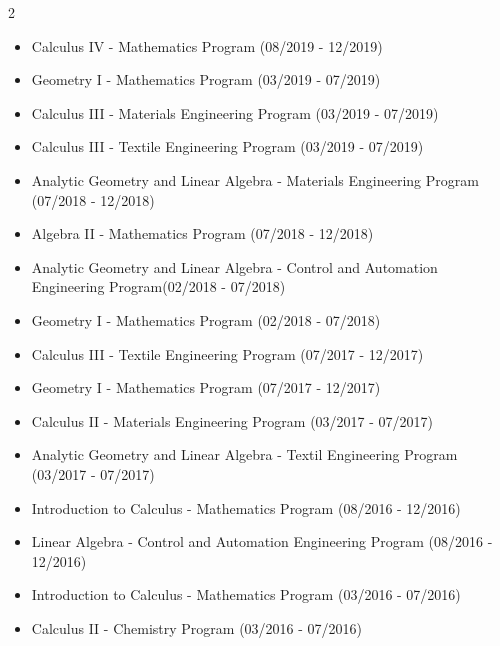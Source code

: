 \documentclass[10pt,A4,english]{article}
\begin{document}
\begin{paracol}{2}
\begin{rightcolumn}
\begin{enumerate}
\begin{itemize}
        \item Calculus IV - Mathematics Program (08/2019 - 12/2019)
        
        \item Geometry I - Mathematics Program (03/2019 - 07/2019)
        
        \item Calculus III - Materials Engineering Program (03/2019 - 07/2019)
        
        \item Calculus III - Textile Engineering Program (03/2019 - 07/2019)
        
        \item Analytic Geometry and Linear Algebra - Materials Engineering Program (07/2018 - 12/2018)
        
        \item Algebra II - Mathematics Program (07/2018 - 12/2018)
        
        \item Analytic Geometry and Linear Algebra - Control and Automation Engineering Program(02/2018 - 07/2018)
        
        \item Geometry I - Mathematics Program (02/2018 - 07/2018)
        
        \item Calculus III - Textile Engineering Program (07/2017 - 12/2017)
        
        \item Geometry I - Mathematics Program (07/2017 - 12/2017)
        
        \item Calculus II - Materials Engineering Program (03/2017 - 07/2017)
        
        \item Analytic Geometry and Linear Algebra - Textil Engineering Program (03/2017 - 07/2017)
        
        \item Introduction to Calculus - Mathematics Program (08/2016 - 12/2016)
        
        \item Linear Algebra - Control and Automation Engineering Program (08/2016 - 12/2016)
        
        \item Introduction to Calculus - Mathematics Program (03/2016 - 07/2016)
        
        \item Calculus II - Chemistry Program (03/2016 - 07/2016)
        

\end{itemize}
\end{enumerate}
\end{rightcolumn}
\end{paracol}
\end{document}
